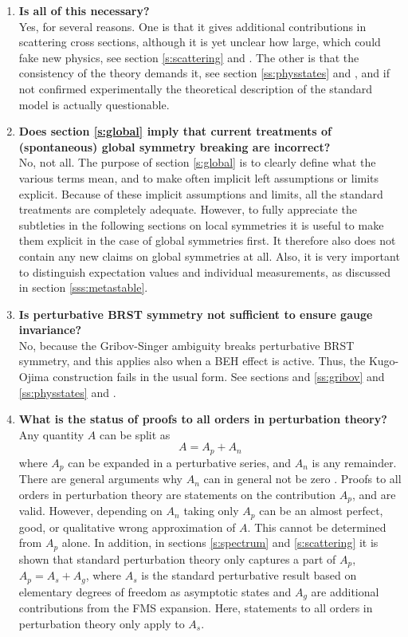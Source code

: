 \documentclass[final,12pt]{article}
\newcommand*{\no}{\noindent}
\newcommand*{\be}{\begin{equation}}
\newcommand*{\ee}{\end{equation}}
\newcommand*{\nn}{\nonumber}
\newcommand*{\1}{1\!\!\!\bot}
\begin{document}
\begin{enumerate}
 
 \item {\bf Is all of this necessary?}\\
 Yes, for several reasons. One is that it gives additional contributions in scattering cross sections, although it is yet unclear how large, which could fake new physics, see section \ref{s:scattering} and \cite{Egger:2017tkd,Raubitzek:unpublished}. The other is that the consistency of the theory demands it, see section \ref{ss:physstates} and \cite{Frohlich:1980gj,Frohlich:1981yi}, and if not confirmed experimentally the theoretical description of the standard model is actually questionable.
 
 \item {\bf Does section \ref{s:global} imply that current treatments of (spontaneous) global symmetry breaking are incorrect?}\\
 No, not all. The purpose of section \ref{s:global} is to clearly define what the various terms mean, and to make often implicit left assumptions or limits explicit. Because of these implicit assumptions and limits, all the standard treatments are completely adequate. However, to fully appreciate the subtleties in the following sections on local symmetries it is useful to make them explicit in the case of global symmetries first. It therefore also does not contain any new claims on global symmetries at all. Also, it is very important to distinguish expectation values and individual measurements, as discussed in section \ref{sss:metastable}.
 
 \item\label{q2} {\bf Is perturbative BRST symmetry not sufficient to ensure gauge invariance?}\\
 No, because the Gribov-Singer ambiguity breaks perturbative BRST symmetry, and this applies also when a BEH effect is active. Thus, the Kugo-Ojima construction fails in the usual form. See sections and \ref{ss:gribov} and \ref{ss:physstates} and \cite{Fujikawa:1982ss,Lenz:2000zt}.
 
 \item {\bf What is the status of proofs to all orders in perturbation theory?}\\
 Any quantity $A$ can be split as
 \be
 A=A_p+A_n\nn
 \ee
 \no where $A_p$ can be expanded in a perturbative series, and $A_n$ is any remainder. There are general arguments why $A_n$ can in general not be zero \cite{Haag:1992hx}. Proofs to all orders in perturbation theory are statements on the contribution $A_p$, and are valid. However, depending on $A_n$ taking only $A_p$ can be an almost perfect, good, or qualitative wrong approximation of $A$. This cannot be determined from $A_p$ alone. In addition, in sections \ref{s:spectrum} and \ref{s:scattering} it is shown that standard perturbation theory only captures a part of $A_p$, $A_p=A_s+A_g$, where $A_s$ is the standard perturbative result based on elementary degrees of freedom as asymptotic states and $A_g$ are additional contributions from the FMS expansion. Here, statements to all orders in perturbation theory only apply to $A_s$.
 

\end{enumerate}
\end{document}
